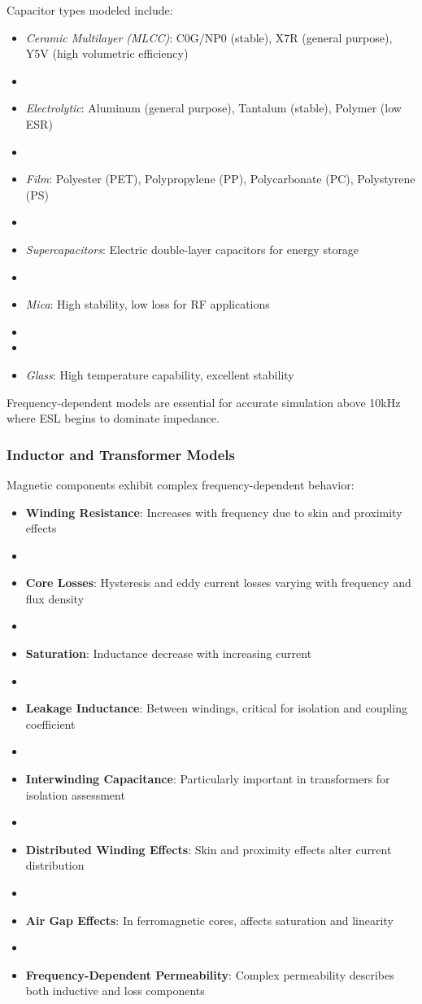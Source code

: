 Capacitor types modeled include:
\begin{itemize}
    \item \textit{Ceramic Multilayer (MLCC)}: C0G/NP0 (stable), X7R (general purpose), Y5V (high volumetric efficiency)
    \item \item \textit{Electrolytic}: Aluminum (general purpose), Tantalum (stable), Polymer (low ESR)
    \item \item \textit{Film}: Polyester (PET), Polypropylene (PP), Polycarbonate (PC), Polystyrene (PS)
    \item \item \textit{Supercapacitors}: Electric double-layer capacitors for energy storage
    \item \item \textit{Mica}: High stability, low loss for RF applications
    \item \item \item \textit{Glass}: High temperature capability, excellent stability
\end{itemize}

Frequency-dependent models are essential for accurate simulation above 10kHz where ESL begins to dominate impedance.

\subsubsection{Inductor and Transformer Models}
Magnetic components exhibit complex frequency-dependent behavior:
\begin{itemize}
    \item \textbf{Winding Resistance}: Increases with frequency due to skin and proximity effects
    \item \item \textbf{Core Losses}: Hysteresis and eddy current losses varying with frequency and flux density
    \item \item \textbf{Saturation}: Inductance decrease with increasing current
    \item \item \textbf{Leakage Inductance}: Between windings, critical for isolation and coupling coefficient
    \item \item \textbf{Interwinding Capacitance}: Particularly important in transformers for isolation assessment
    \item \item \textbf{Distributed Winding Effects}: Skin and proximity effects alter current distribution
    \item \item \textbf{Air Gap Effects}: In ferromagnetic cores, affects saturation and linearity
    \item \item \textbf{Frequency-Dependent Permeability}: Complex permeability describes both inductive and loss components
\end{itemize}

